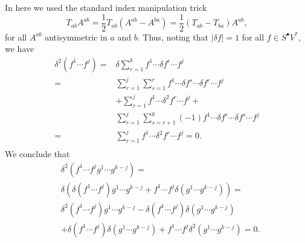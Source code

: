 In here we used the standard index manipulation trick
\begin{equation}
T_{ab}A^{ab}=\frac{1}{2}T_{ab}(A^{ab}-A^{ba})=\frac{1}{2}(T_{ab}-T_{ba})A^{ab},
\end{equation}
for all $A^{ab}$ antisymmetric in $a$ and $b$. Thus, noting that $|\delta f|=1$ for all $f\in S^\bullet V^*$, we have
\begin{equation}
\begin{aligned}
\delta^2(f^1\cdots f^j)=&\delta\sum_{r=1}^k f^1\cdots\delta f^r\cdots f^j\\
=&\sum_{r=1}^j\sum_{s=1}^r f^1\cdots\delta f^s\cdots\delta f^r\cdots f^j\\
&+\sum_{r=1}^jf^1\cdots\delta^2f^r\cdots f^j+\\
&\sum_{r=1}^j\sum_{s=r+1}^k (-1) f^1\cdots\delta f^r\cdots\delta f^s\cdots f^j\\
=&\sum_{r=1}^jf^1\cdots\delta^2f^r\cdots f^j=0.\\
\end{aligned}
\end{equation}
We conclude that 
\begin{equation}
\begin{aligned}
&\delta^2(f^1\cdots f^jg^1\cdots g^{k-j})=\\
&\delta(\delta(f^1\cdots f^j)g^1\cdots g^{k-j}+f^1\cdots f^j\delta(g^1\cdots g^{k-j}))=\\
&\delta^2(f^1\cdots f^j)g^1\cdots g^{k-j}-\delta(f^1\cdots f^j)\delta(g^1\cdots g^{k-j})\\
&+\delta(f^1\cdots f^j)\delta(g^1\cdots g^{k-j})+f^1\cdots f^j\delta^2(g^1\cdots g^{k-j})=0.
\end{aligned}
\end{equation}

